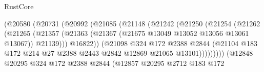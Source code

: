 \begin{lexlean}{RustCore}
\begin{coremodule}
                                  (@20580
                                    (@20731
                                      (@20992
                                        (@21085
                                          (@21148
                                            (@21242
                                              (@21250
                                                (@21254
                                                  (@21262
                                                    (@21265
                                                      (@21357
                                                        (@21363
                                                          (@21367
                                                            (@21675
                                                              @13049
                                                              @13052
                                                              @13056
                                                              @13061
                                                              @13067))
                                                          @21139)))
                                                    @16822))
                                                (@21098
                                                  @324
                                                  @172
                                                  @2388
                                                  @2844
                                                  (@21104
                                                    @183
                                                    @172
                                                    @214
                                                    @27
                                                    @2388
                                                    @2443
                                                    @2842
                                                    @12869
                                                    @21065
                                                    @13101)))))))))
                                  (@12848
                                    @20295
                                    @324
                                    @172
                                    @2388
                                    @2844
                                    (@12857
                                      @20295
                                      @2712
                                      @183
                                      @172

\end{coremodule}
\end{lexlean}
